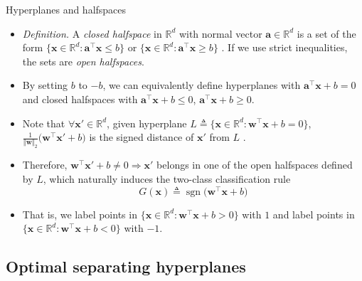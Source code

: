 \documentclass{beamer}
\numberwithin{equation}{section}
\begin{document}
\begin{frame}{Hyperplanes and halfspaces}
    \begin{itemize}
        \item
        \textit{Definition.} A \textit{closed halfspace} in $ \mathbb{R}^d $
        with normal vector $ \mathbf{a} \in \mathbb{R}^d $ is a set of the form
        $ \{\mathbf{x} \in \mathbb{R}^d : \mathbf{a}^\top\mathbf{x} \le b\} $
        or $ \{\mathbf{x} \in \mathbb{R}^d : \mathbf{a}^\top\mathbf{x} \ge
        b\} $ \cite{bv_convex_opt}. If we use strict inequalities, the sets
        are \textit{open halfspaces}.

        \item
        By setting $ b $ to $ -b $, we can equivalently define hyperplanes
        with $ \mathbf{a}^\top\mathbf{x} + b = 0 $ and closed halfspaces with
        $ \mathbf{a}^\top\mathbf{x} + b \le 0 $,
        $ \mathbf{a}^\top\mathbf{x} + b \ge 0 $.

        \item
        Note that $ \forall \mathbf{x}' \in \mathbb{R}^d $, given hyperplane
        $ L \triangleq \{\mathbf{x} \in \mathbb{R}^d :
        \mathbf{w}^\top\mathbf{x} + b = 0 \} $,
        $ \frac{1}{\Vert\mathbf{w}\Vert_2}
        \big(\mathbf{w}^\top\mathbf{x}' + b\big) $ is the signed distance of
        $ \mathbf{x}' $ from $ L $ \cite{esl}.

        \item
        Therefore, $ \mathbf{w}^\top\mathbf{x}' + b \ne 0 \Rightarrow
        \mathbf{x}' $ belongs in one of the open halfspaces defined by $ L $,
        which naturally induces the two-class classification rule
        \begin{equation} \label{eq:svm_classifier}
            G(\mathbf{x}) \triangleq \operatorname{sgn}\big(
                \mathbf{w}^\top\mathbf{x} + b
            \big)
        \end{equation}

        \item
        That is, we label points in $ \{\mathbf{x} \in \mathbb{R}^d :
        \mathbf{w}^\top\mathbf{x} + b > 0\} $ with $ 1 $ and label points in
        $ \{\mathbf{x} \in \mathbb{R}^d : \mathbf{w}^\top\mathbf{x} + b < 0\} $
        with $ -1 $.
    \end{itemize}
\end{frame}

\subsection{Optimal separating hyperplanes}
\end{document}
